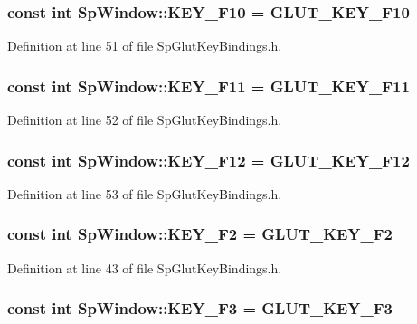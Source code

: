 \subsubsection{\setlength{\rightskip}{0pt plus 5cm}const int {\bf Sp\-Window::KEY\_\-F10} = GLUT\_\-KEY\_\-F10\hspace{0.3cm}{\tt  [static]}}\label{classSpark_1_1SpWindow_s20}


Definition at line 51 of file Sp\-Glut\-Key\-Bindings.h.
\subsubsection{\setlength{\rightskip}{0pt plus 5cm}const int {\bf Sp\-Window::KEY\_\-F11} = GLUT\_\-KEY\_\-F11\hspace{0.3cm}{\tt  [static]}}\label{classSpark_1_1SpWindow_s21}


Definition at line 52 of file Sp\-Glut\-Key\-Bindings.h.
\subsubsection{\setlength{\rightskip}{0pt plus 5cm}const int {\bf Sp\-Window::KEY\_\-F12} = GLUT\_\-KEY\_\-F12\hspace{0.3cm}{\tt  [static]}}\label{classSpark_1_1SpWindow_s22}


Definition at line 53 of file Sp\-Glut\-Key\-Bindings.h.
\subsubsection{\setlength{\rightskip}{0pt plus 5cm}const int {\bf Sp\-Window::KEY\_\-F2} = GLUT\_\-KEY\_\-F2\hspace{0.3cm}{\tt  [static]}}\label{classSpark_1_1SpWindow_s12}


Definition at line 43 of file Sp\-Glut\-Key\-Bindings.h.
\subsubsection{\setlength{\rightskip}{0pt plus 5cm}const int {\bf Sp\-Window::KEY\_\-F3} = GLUT\_\-KEY\_\-F3\hspace{0.3cm}{\tt  [static]}}\label{classSpark_1_1SpWindow_s13}


